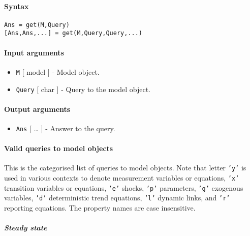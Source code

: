


	\paragraph{Syntax}

\begin{verbatim}
Ans = get(M,Query)
[Ans,Ans,...] = get(M,Query,Query,...)
\end{verbatim}

\paragraph{Input arguments}

\begin{itemize}
\item
  \texttt{M} {[} model {]} - Model object.
\item
  \texttt{Query} {[} char {]} - Query to the model object.
\end{itemize}

\paragraph{Output arguments}

\begin{itemize}
\itemsep1pt\parskip0pt
\item
  \texttt{Ans} {[} \ldots{} {]} - Answer to the query.
\end{itemize}

\paragraph{Valid queries to model
objects}

This is the categorised list of queries to model objects. Note that
letter \texttt{'y'} is used in various contexts to denote measurement
variables or equations, \texttt{'x'} transition variables or equations,
\texttt{'e'} shocks, \texttt{'p'} parameters, \texttt{'g'} exogenous
variables, \texttt{'d'} deterministic trend equations, \texttt{'l'}
dynamic links, and \texttt{'r'} reporting equations. The property names
are case insensitive.

\subparagraph{Steady state}

